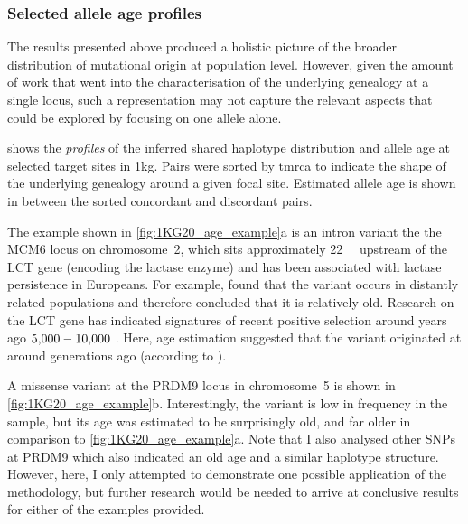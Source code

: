 %
\subsubsection{Selected allele age profiles}
%

The results presented above produced a holistic picture of the broader distribution of mutational origin at population level.
However, given the amount of work that went into the characterisation of the underlying genealogy at a single locus, such a representation may not capture the relevant aspects that could be explored by focusing on one allele alone.

%

%

 shows the \emph{profiles} of the inferred shared haplotype distribution and allele age at  selected target sites in \gls{1kg}.
Pairs were sorted by \gls{tmrca} to indicate the shape of the underlying genealogy around a given focal site.
Estimated allele age is shown in between the sorted concordant and discordant pairs.

The example shown in \cref{fig:1KG20_age_example}{a} is an intron variant the the MCM6 locus on chromosome~2, which sits approximately \SI{22}{\kilo\basepair} upstream of the LCT gene (encoding the lactase enzyme) and has been associated with lactase persistence in Europeans.
For example, \citet{enattah2002identification} found that the variant occurs in distantly related populations and therefore concluded that it is relatively old.
Research on the LCT gene has indicated signatures of recent positive selection around years ago ${\n{5000}-\n{10000}}$ \citep{bersaglieri2004genetic}.
Here, age estimation suggested that the variant originated at around  generations ago (according to \ClockC).

A missense variant at the PRDM9 locus in chromosome~5 is shown in \cref{fig:1KG20_age_example}{b}.
Interestingly, the variant is low in frequency in the sample, but its age was estimated to be surprisingly old, and far older in comparison to \cref{fig:1KG20_age_example}{a}.
Note that I also analysed other SNPs at PRDM9 which also indicated an old age and a similar haplotype structure.
However, here, I only attempted to demonstrate one possible application of the methodology, but further research would be needed to arrive at conclusive results for either of the examples provided.




%
% 
%


